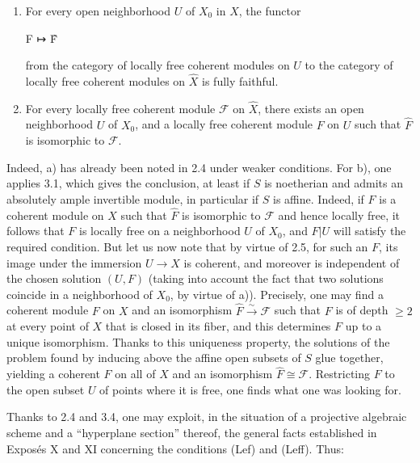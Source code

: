\documentclass[
  11pt,
  a4paper,
]{book}
\newenvironment{Shaded}{}{}
\newcommand{\NormalTok}[1]{#1}
\begin{document}
\begin{enumerate}
\def\labelenumi{\arabic{enumi}.}
\item
  For every open neighborhood \(U\) of \(X_{0}\) in \(X\), the functor

\begin{Shaded}
\begin{Highlighting}[]
\NormalTok{F ↦ F̂}
\end{Highlighting}
\end{Shaded}

  from the category of locally free coherent modules on \(U\) to the
  category of locally free coherent modules on \(\hat{X}\) is fully
  faithful.
\item
  For every locally free coherent module \(\mathcal{F}\) on \(\hat{X}\),
  there exists an open neighborhood \(U\) of \(X_{0}\), and a locally
  free coherent module \(F\) on \(U\) such that \(\hat{F}\) is
  isomorphic to \(\mathcal{F}\).
\end{enumerate}

Indeed, a) has already been noted in 2.4 under weaker conditions. For
b), one applies 3.1, which gives the conclusion, at least if \(S\) is
noetherian and admits an absolutely ample invertible module, in
particular if \(S\) is affine. Indeed, if \(F\) is a coherent module on
\(X\) such that \(\hat{F}\) is isomorphic to \(\mathcal{F}\) and hence
locally free, it follows that \(F\) is locally free on a neighborhood
\(U\) of \(X_{0}\), and \(F|U\) will satisfy the required condition. But
let us now note that by virtue of 2.5, for such an \(F\), its image
under the immersion \(U \to X\) is coherent, and moreover is independent
of the chosen solution \((U, F)\) (taking into account the fact that two
solutions coincide in a neighborhood of \(X_{0}\), by virtue of a)).
Precisely, one may find a coherent module \(F\) on \(X\) and an
isomorphism \(\hat{F}
\xrightarrow{\sim} \mathcal{F}\) such that \(F\) is of depth
\(\geqslant 2\) at every point of \(X\) that is closed in its fiber, and
this determines \(F\) up to a unique isomorphism. Thanks to this
uniqueness property, the solutions of the problem found by inducing
above the affine open subsets of \(S\) glue together, yielding a
coherent \(F\) on all of \(X\) and an isomorphism
\(\hat{F} \cong \mathcal{F}\). Restricting \(F\) to the open subset
\(U\) of points where it is free, one finds what one was looking for.

Thanks to 2.4 and 3.4, one may exploit, in the situation of a projective
algebraic scheme and a ``hyperplane section'' thereof, the general facts
established in Exposés X and XI concerning the conditions (Lef) and
(Leff). Thus:
\end{document}
